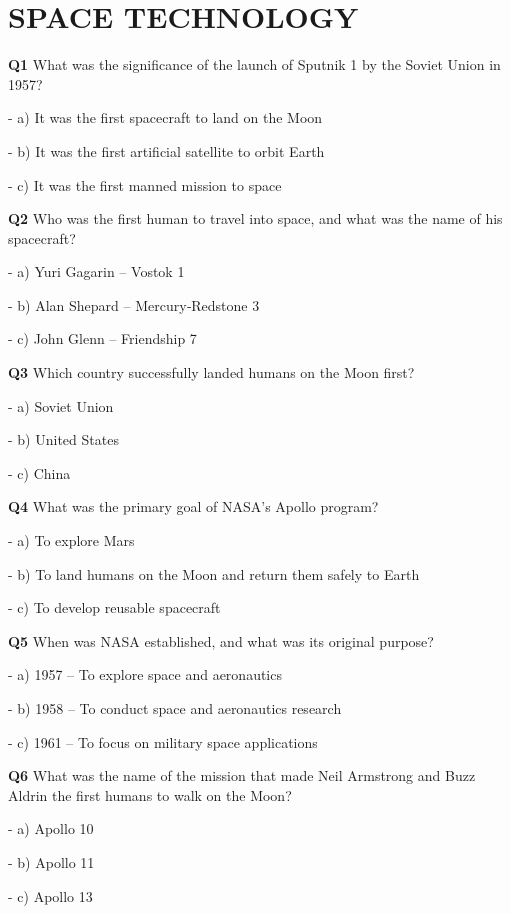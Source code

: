 \section{SPACE TECHNOLOGY}

\textbf{Q1} What was the significance of the launch of Sputnik 1 by the Soviet Union in 1957?\par
\quad - a) It was the first spacecraft to land on the Moon\par
\quad - b) It was the first artificial satellite to orbit Earth\par
\quad - c) It was the first manned mission to space\par

\textbf{Q2} Who was the first human to travel into space, and what was the name of his spacecraft?\par
\quad - a) Yuri Gagarin – Vostok 1\par
\quad - b) Alan Shepard – Mercury‑Redstone 3\par
\quad - c) John Glenn – Friendship 7\par

\textbf{Q3} Which country successfully landed humans on the Moon first?\par
\quad - a) Soviet Union\par
\quad - b) United States\par
\quad - c) China\par

\textbf{Q4} What was the primary goal of NASA's Apollo program?\par
\quad - a) To explore Mars\par
\quad - b) To land humans on the Moon and return them safely to Earth\par
\quad - c) To develop reusable spacecraft\par

\textbf{Q5} When was NASA established, and what was its original purpose?\par
\quad - a) 1957 – To explore space and aeronautics\par
\quad - b) 1958 – To conduct space and aeronautics research\par
\quad - c) 1961 – To focus on military space applications\par

\textbf{Q6} What was the name of the mission that made Neil Armstrong and Buzz Aldrin the first humans to walk on the Moon?\par
\quad - a) Apollo 10\par
\quad - b) Apollo 11\par
\quad - c) Apollo 13\par

